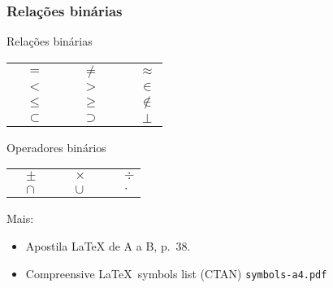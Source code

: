 \begin{frame}
  \frametitle{Relações binárias}
  \begin{block}{Relações binárias}
    \centering
    \begin{tabular}{lcllcllc}
      \blue{\texttt{\string=}} & $=$ &&
      \blue{\texttt{\string\neq}} & $\neq$ &&
      \blue{\texttt{\string\approx}} & $\approx$ \\
      \blue{\texttt{\string<}} & $<$ &&
      \blue{\texttt{\string>}} & $>$ &&
      \blue{\texttt{\string\in}} & $\in$ \\
      \blue{\texttt{\string\leq}} & $\leq$ &&
      \blue{\texttt{\string\geq}} & $\geq$ &&
      \blue{\texttt{\string\not\string\in}} & $\not\in$ \\
      \blue{\texttt{\string\subset}} & $\subset$ &&
      \blue{\texttt{\string\supset}} & $\supset$ &&
      \blue{\texttt{\string\perp}} & $\perp$
    \end{tabular}
  \end{block}

  \begin{block}{Operadores binários}
    \centering
    \begin{tabular}{llllllll}
      \blue{\texttt{\string\pm}} & $\pm$ &&
      \blue{\texttt{\string\times}} & $\times$ &&
      \blue{\texttt{\string\div}} & $\div$ \\
      \blue{\texttt{\string\cap}} & $\cap$ &&
      \blue{\texttt{\string\cup}} & $\cup$ &&
      \blue{\texttt{\string\cdot}} & $\cdot$ 
    \end{tabular}
  \end{block}

\bigskip

  Mais:

  \begin{itemize}
  \item Apostila \LaTeX{} de A a B, p.\ 38.
  \item Compreensive \LaTeX\ symbols list (CTAN) \texttt{symbols-a4.pdf}
  \end{itemize}
\end{frame}


